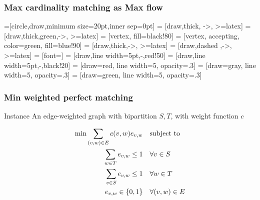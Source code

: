 \begin{frame}[fragile]
\frametitle{Max cardinality matching as Max flow}

=[circle,draw,minimum size=20pt,inner sep=0pt]
 = [draw,thick, ->, >=latex]
 = [draw,thick,green,->, >=latex]
 = [vertex, fill=black!80]
 = [vertex, accepting, color=green, fill=blue!90]
 = [draw,thick,->, >=latex]
 = [draw,dashed ,->, >=latex]
 = [font=\small]
 = [draw,line width=5pt,-,red!50]
 = [draw,line width=5pt,-,black!20]
 = [draw=red, line width=5,  opacity=.3]
 = [draw=gray, line width=5, opacity=.3]
 = [draw=green, line width=5, opacity=.3]
\begin{figure}
\end{figure}
\end{frame}

\begin{frame}[fragile]
\frametitle{Min weighted perfect matching}

\begin{block}{Instance}
An edge-weighted graph \g with bipartition \(S,T\), with weight function \(c\)
\end{block}

\begin{align}
  \min \sum_{(v,w)\in E} c(v,w)e_{v,w}                  \quad&\text{subject to }\notag\\
  \sum_{w\in T} e_{v,w} \le 1 \quad& \forall v\in S           \notag\\
  \sum_{v\in S} e_{v,w} \le 1 \quad& \forall w\in T           \notag\\
  e_{v,w}\in \{0,1\}         \quad& \forall (v,w)\in E \notag
\end{align}
\end{frame}



